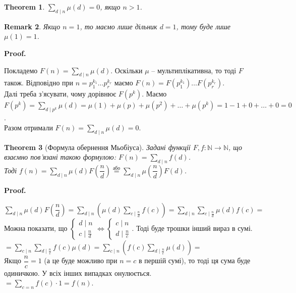 \documentclass[a4paper, 10pt]{article}
\makeatletter
\theoremstyle{theoremdd}
\newtheorem{theorem}{Theorem}[subsection]
\theoremstyle{theoremdd}
\theoremstyle{theoremdd}
\theoremstyle{theoremdd}
\theoremstyle{theoremdd}
\theoremstyle{theoremdd}
\newtheorem{remark}[theorem]{Remark}
\theoremstyle{theoremdd}
\theoremstyle{theoremdd}
\renewenvironment{proof}[1][Proof.\\]{\par
\pushQED{\hfill \qed}%
\normalfont \topsep6\p@\@plus6\p@\relax
\trivlist
\item\relax
{\bfseries
#1\@addpunct{.}}\hspace\labelsep\ignorespaces
}{%
\popQED\endtrivlist\@endpefalse
}
\makeatother
\begin{document}
\begin{theorem}
$\displaystyle\sum_{d \mid n} \mu(d) = 0$, якщо $n > 1$.
\end{theorem}

\begin{remark}
Якщо $n = 1$, то маємо лише дільник $d = 1$, тому буде лише $\mu(1) = 1$.
\end{remark}

\begin{proof}
Покладемо $F(n) = \displaystyle\sum_{d \mid n} \mu(d)$. Оскільки $\mu$ -- мультиплікативна, то тоді $F$ також. Відповідно при $n = p_1^{k_1} \dots p_r^{k_r}$ маємо $F(n) = F(p_1^{k_1}) \dots F(p_r^{k_r})$.\\
Далі треба з'ясувати, чому дорівнює $F(p^k)$. Маємо\\
$F(p^k) = \displaystyle\sum_{d \mid p^k} \mu(d) = \mu(1) + \mu(p) + \mu(p^2) + \dots + \mu(p^k) = 1 - 1 + 0 + \dots + 0 = 0$.\\
Разом отримали $F(n) = \displaystyle\sum_{d \mid n} \mu(d) = 0$.
\end{proof}

\begin{theorem}[Формула обернення Мьобіуса]
Задані функції $F,f \colon \mathbb{N} \to \mathbb{N}$, що взаємно пов'язані такою формулою: $F(n) = \displaystyle\sum_{d \mid n} f(d)$. \\
Тоді $f(n) = \displaystyle\sum_{d \mid n} \mu(d) F\left(\dfrac{n}{d} \right) \overset{\text{або}}{=} \sum_{d \mid n} \mu\left( \dfrac{n}{d} \right) F(d)$.
\end{theorem}

\begin{proof}
$\displaystyle\sum_{d \mid n} \mu(d) F\left( \dfrac{n}{d} \right) = \sum_{d \mid n} \left( \mu(d) \sum_{c \mid \frac{n}{d}} f(c) \right) = \sum_{d \mid n} \sum_{c \mid \frac{n}{d}} \mu(d)f(c) \boxed{=}$\\
Можна показати, що $\begin{cases} d \mid n \\ c \mid \frac{n}{d} \end{cases} \iff \begin{cases} c \mid n \\ d \mid \frac{n}{c} \end{cases}$. Тоді буде трошки інший вираз в сумі.\\
$\boxed{=} \displaystyle\sum_{c \mid n} \sum_{d \mid \frac{n}{c}} f(c) \mu(d) = \sum_{c \mid n} \left( f(c) \sum_{d \mid \frac{n}{c}} \mu(d) \right) \boxed{\boxed{=}}$\\
Якщо $\dfrac{n}{c} = 1$ (а це буде можливо при $n = c$ в першій сумі), то тоді ця сума буде одиничкою. У всіх інших випадках онулюється.\\
$\boxed{\boxed{=}} \displaystyle\sum_{c = n} f(c) \cdot 1 = f(n)$.
\end{proof}
\end{document}
